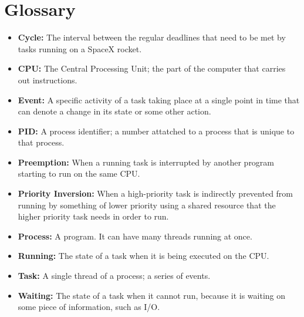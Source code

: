 \documentclass{hmcclinic}
\begin{document}
\chapter{Glossary}
\begin{itemize}[ ]
\item {\bf Cycle:} The interval between the regular deadlines that need to be
  met by tasks running on a SpaceX rocket.
\item {\bf CPU:} The Central Processing Unit; the part of the computer that carries out instructions.
\item{\bf Event:} A specific activity of a task taking place at a single point in time that can denote a change in its state or some other action.
\item {\bf PID:} A process identifier; a number attatched to a process that is unique to that process.
\item {\bf Preemption:} When a running task is interrupted by another program starting to run on the same CPU. 
\item {\bf Priority Inversion:} When a high-priority task is indirectly
  prevented from running by something of
lower priority using a shared resource that the higher priority task needs in
order to run. 
\item{\bf Process:} A program. It can have many threads running at once.
\item {\bf Running:} The state of a task when it is being executed on the CPU.
\item {\bf Task:} A single thread of a process; a series of events.
\item {\bf Waiting:} The state of a task when it cannot run, because it is waiting 
  on some piece of information, such as I/O.
\end{itemize}
\end{document}
